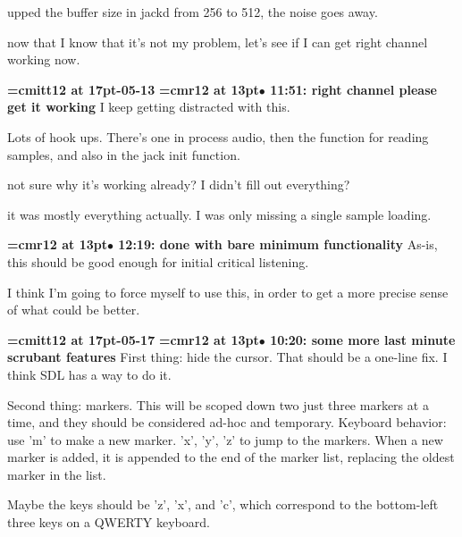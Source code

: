 upped the buffer size in jackd from 256 to 512, the noise goes away.
\par

now that I know that it's not my problem, let's see if I can get right channel working now.
\par

{\medskip\noindent\bf\font\titlefont=cmitt12 at 17pt-05-13}\medskip
{\smallskip\noindent\bf\font\titlefont=cmr12 at 13pt\titlefont $\bullet$ 11:51: right channel please get it working}\smallskip
I keep getting distracted with this.
\par

Lots of hook ups. There's one in process audio, then the function for reading samples, and also in the jack init function.
\par

not sure why it's working already? I didn't fill out everything?
\par

it was mostly everything actually. I was only missing a single sample loading.
\par

{\smallskip\noindent\bf\font\titlefont=cmr12 at 13pt\titlefont $\bullet$ 12:19: done with bare minimum functionality}\smallskip
As-is, this should be good enough for initial critical listening.
\par

I think I'm going to force myself to use this, in order to get a more precise sense of what could be better.
\par

{\medskip\noindent\bf\font\titlefont=cmitt12 at 17pt-05-17}\medskip
{\smallskip\noindent\bf\font\titlefont=cmr12 at 13pt\titlefont $\bullet$ 10:20: some more last minute scrubant features}\smallskip
First thing: hide the cursor. That should be a one-line fix. I think SDL has a way to do it.
\par

Second thing: markers. This will be scoped down two just three markers at a time, and they should be considered ad-hoc and temporary. Keyboard behavior: use 'm' to make a new marker. 'x', 'y', 'z' to jump to the markers. When a new marker is added, it is appended to the end of the marker list, replacing the oldest marker in the list.
\par

Maybe the keys should be 'z', 'x', and 'c', which correspond to the bottom-left three keys on a QWERTY keyboard.
\par


